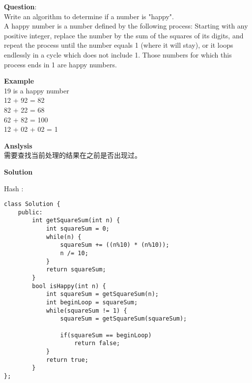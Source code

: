     
\begin{description}
    \item{\textbf{Question}}:\\%
		Write an algorithm to determine if a number is "happy".\\
		A happy number is a number defined by the following process: Starting with any positive integer, replace the number by the sum of the squares of its digits, and repeat the process until the number equals 1 (where it will stay), or it loops endlessly in a cycle which does not include 1. Those numbers for which this process ends in 1 are happy numbers.

    \item{\textbf{Example}}\\
		 19 is a happy number\\
		 12 + 92 = 82\\
		 82 + 22 = 68\\
		 62 + 82 = 100\\
		 12 + 02 + 02 = 1

    \item{\textbf{Anslysis}}\\
		需要查找当前处理的结果在之前是否出现过。\\

    \item{\textbf{Solution}}\\
	\item{Hash} : \\
		\begin{lstlisting}
class Solution {
	public:
		int getSquareSum(int n) {
			int squareSum = 0;
			while(n) {
				squareSum += ((n%10) * (n%10));
				n /= 10;
			}
			return squareSum;
		}
		bool isHappy(int n) {
			int squareSum = getSquareSum(n);
			int beginLoop = squareSum;
			while(squareSum != 1) {
				squareSum = getSquareSum(squareSum);

				if(squareSum == beginLoop)
					return false;
			}
			return true;
		}
};

		\end{lstlisting}

\end{description}

